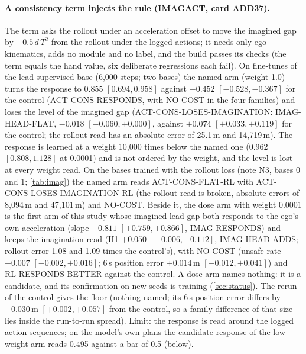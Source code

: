 \paragraph{A consistency term injects the rule (IMAGACT, card ADD37).} The term asks the rollout under an acceleration offset to move the imagined gap by $-0.5\,d\,T^2$ from the rollout under the logged actions; it needs only ego kinematics, adds no module and no label, and the build passes its checks (the term equals the hand value, six deliberate regressions each fail). On fine-tunes of the lead-supervised base (6,000 steps; two bases) the named arm (weight 1.0) turns the response to $0.855$ $[0.694,0.958]$ against $-0.452$ $[-0.528,-0.367]$ for the control (ACT-CONS-RESPONDS, with NO-COST in the four families) and loses the level of the imagined gap (ACT-CONS-LOSES-IMAGINATION: IMAG-HEAD-FLAT, $-0.018$ $[-0.060,+0.000]$, against $+0.074$ $[+0.033,+0.119]$ for the control; the rollout read has an absolute error of 25.1\,m and 14,719\,m). The response is learned at a weight 10,000 times below the named one (0.962 $[0.808,1.128]$ at 0.0001) and is not ordered by the weight, and the level is lost at every weight read. On the bases trained with the rollout loss (note N3, bases 0 and 1; \cref{tab:imag}) the named arm reads ACT-CONS-FLAT-RL with ACT-CONS-LOSES-IMAGINATION-RL (the rollout read is broken, absolute errors of 8,094\,m and 47,101\,m) and NO-COST. Beside it, the dose arm with weight 0.0001 is the first arm of this study whose imagined lead gap both responds to the ego's own acceleration (slope $+0.811$ $[+0.759,+0.866]$, IMAG-RESPONDS) and keeps the imagination read (H1 $+0.050$ $[+0.006,+0.112]$, IMAG-HEAD-ADDS; rollout error 1.08 and 1.09 times the control's), with NO-COST (unsafe rate $+0.007$ $[-0.002,+0.016]$; 6\,s position error $+0.014$\,m $[-0.012,+0.041]$) and RL-RESPONDS-BETTER against the control. A dose arm names nothing: it is a candidate, and its confirmation on new seeds is training (\cref{sec:status}). The rerun of the control gives the floor (nothing named; its 6\,s position error differs by $+0.030$\,m $[+0.002,+0.057]$ from the control, so a family difference of that size lies inside the run-to-run spread). Limit: the response is read around the logged action sequences; on the model's own plans the candidate response of the low-weight arm reads 0.495 against a bar of 0.5 (below).

